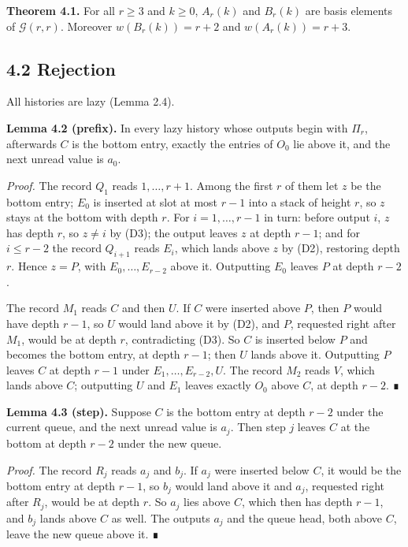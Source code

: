 \documentclass[11pt,letterpaper]{article}
\begin{document}
\textbf{Theorem 4.1.} For all \(r\ge3\) and \(k\ge0\), \(A_r(k)\) and
\(B_r(k)\) are basis elements of \(\mathcal G(r,r)\). Moreover
\(w(B_r(k))=r+2\) and \(w(A_r(k))=r+3\).

\subsection{4.2 Rejection}\label{rejection-1}

All histories are lazy (Lemma 2.4).

\textbf{Lemma 4.2 (prefix).} In every lazy history whose outputs begin
with \(\Pi_r\), afterwards \(C\) is the bottom entry, exactly the
entries of \(O_0\) lie above it, and the next unread value is \(a_0\).

\emph{Proof.} The record \(Q_1\) reads \(1,\dots,r+1\). Among the first
\(r\) of them let \(z\) be the bottom entry; \(E_0\) is inserted at slot
at most \(r-1\) into a stack of height \(r\), so \(z\) stays at the
bottom with depth \(r\). For \(i=1,\dots,r-1\) in turn: before output
\(i\), \(z\) has depth \(r\), so \(z\ne i\) by (D3); the output leaves
\(z\) at depth \(r-1\); and for \(i\le r-2\) the record \(Q_{i+1}\)
reads \(E_i\), which lands above \(z\) by (D2), restoring depth \(r\).
Hence \(z=P\), with \(E_0,\dots,E_{r-2}\) above it. Outputting \(E_0\)
leaves \(P\) at depth \(r-2\).

The record \(M_1\) reads \(C\) and then \(U\). If \(C\) were inserted
above \(P\), then \(P\) would have depth \(r-1\), so \(U\) would land
above it by (D2), and \(P\), requested right after \(M_1\), would be at
depth \(r\), contradicting (D3). So \(C\) is inserted below \(P\) and
becomes the bottom entry, at depth \(r-1\); then \(U\) lands above it.
Outputting \(P\) leaves \(C\) at depth \(r-1\) under
\(E_1,\dots,E_{r-2},U\). The record \(M_2\) reads \(V\), which lands
above \(C\); outputting \(U\) and \(E_1\) leaves exactly \(O_0\) above
\(C\), at depth \(r-2\). ∎

\textbf{Lemma 4.3 (step).} Suppose \(C\) is the bottom entry at depth
\(r-2\) under the current queue, and the next unread value is \(a_j\).
Then step \(j\) leaves \(C\) at the bottom at depth \(r-2\) under the
new queue.

\emph{Proof.} The record \(R_j\) reads \(a_j\) and \(b_j\). If \(a_j\)
were inserted below \(C\), it would be the bottom entry at depth
\(r-1\), so \(b_j\) would land above it and \(a_j\), requested right
after \(R_j\), would be at depth \(r\). So \(a_j\) lies above \(C\),
which then has depth \(r-1\), and \(b_j\) lands above \(C\) as well. The
outputs \(a_j\) and the queue head, both above \(C\), leave the new
queue above it. ∎
\end{document}
